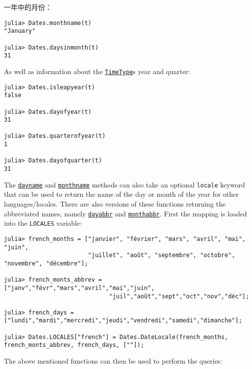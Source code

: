 一年中的月份：




\begin{verbatim}
julia> Dates.monthname(t)
"January"

julia> Dates.daysinmonth(t)
31
\end{verbatim}



As well as information about the \hyperlink{4438614350756187528}{\texttt{TimeType}}{\textquotesingle}s year and quarter:




\begin{verbatim}
julia> Dates.isleapyear(t)
false

julia> Dates.dayofyear(t)
31

julia> Dates.quarterofyear(t)
1

julia> Dates.dayofquarter(t)
31
\end{verbatim}



The \hyperlink{2440842966718954493}{\texttt{dayname}} and \hyperlink{16585759639636493546}{\texttt{monthname}} methods can also take an optional \texttt{locale} keyword that can be used to return the name of the day or month of the year for other languages/locales. There are also versions of these functions returning the abbreviated names, namely \hyperlink{18198970391837299875}{\texttt{dayabbr}} and \hyperlink{12804940912944832895}{\texttt{monthabbr}}. First the mapping is loaded into the \texttt{LOCALES} variable:




\begin{verbatim}
julia> french_months = ["janvier", "février", "mars", "avril", "mai", "juin",
                        "juillet", "août", "septembre", "octobre", "novembre", "décembre"];

julia> french_monts_abbrev = ["janv","févr","mars","avril","mai","juin",
                              "juil","août","sept","oct","nov","déc"];

julia> french_days = ["lundi","mardi","mercredi","jeudi","vendredi","samedi","dimanche"];

julia> Dates.LOCALES["french"] = Dates.DateLocale(french_months, french_monts_abbrev, french_days, [""]);
\end{verbatim}



The above mentioned functions can then be used to perform the queries:




